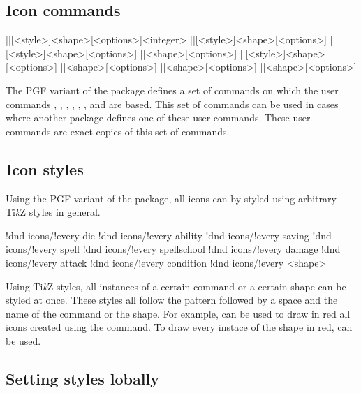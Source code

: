 \documentclass[a4paper]{article}
\begin{document}
\subsection{Icon commands}

\begin{macrodef}
|\dndiconsdie|[<style>]{<shape>}[<options>]{<integer>}
|\dndiconsability|[<style>]{<shape>}[<options>]
|\dndiconssaving|[<style>]{<shape>}[<options>]
|\dndiconsspell|{<shape>}[<options>]
|\dndiconsspellschool|[<style>]{<shape>}[<options>]
|\dndiconsdamage|{<shape>}[<options>]
|\dndiconsattack|{<shape>}[<options>]
|\dndiconscondition|{<shape>}[<options>]
\end{macrodef}
The PGF variant of the package defines a set of commands on which the user commands \macro{\die}, \macro{\ability}, \macro{\saving}, \macro{\spell}, \macro{\spellschool}, \macro{\damage}, \macro{\attack} and \macro{\condition} are based. This set of commands can be used in cases where another package defines one of these user commands. These user commands are exact copies of this set of commands.

\subsection{Icon styles}

Using the PGF variant of the package, all icons can by styled using arbitrary Ti\emph{k}Z styles in general. 

\begin{macrodef}
!dnd icons/!every die
!dnd icons/!every ability
!dnd icons/!every saving
!dnd icons/!every spell
!dnd icons/!every spellschool
!dnd icons/!every damage
!dnd icons/!every attack
!dnd icons/!every condition
!dnd icons/!every <shape>
\end{macrodef}
Using Ti\emph{k}Z styles, all instances of a certain command or a certain shape can be styled at once. These styles all follow the pattern  followed by a space and the name of the command or the shape. For example,  can be used to draw in red all icons created using the \macro{\die} command. To draw every instace of the  shape in red,  can be used.

\subsection{Setting styles lobally}
\end{document}
